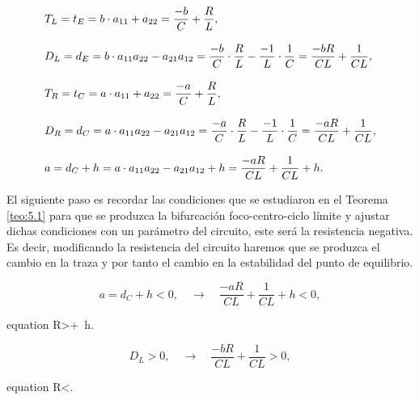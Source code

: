 \documentclass[12pt,a4paper]{report} %
\begin{document}
	\begin{equation}
		\label{eq:misistema}
			\scalebox{1}{$\displaystyle
		\begin{aligned}
			&T_L=t_E = b \cdot a_{11} + a_{22} = \frac{-b}{C}+\frac{R}{L}, \\[3mm]
			&D_L=d_E = b \cdot a_{11}a_{22} - a_{21}a_{12} = \frac{-b}{C}\cdot\frac{R}{L}-\frac{-1}{L}\cdot\frac{1}{C}=\frac{-bR}{CL}+\frac{1}{CL}, \\[3mm]
			&T_R=t_C = a \cdot a_{11} + a_{22} = \frac{-a}{C}+\frac{R}{L}, \\[3mm]
			&D_R=d_C = a \cdot a_{11}a_{22} - a_{21}a_{12} = \frac{-a}{C}\cdot\frac{R}{L}-\frac{-1}{L}\cdot\frac{1}{C}=\frac{-aR}{CL}+\frac{1}{CL},\\[3mm]
			&a=d_C+h = a \cdot a_{11}a_{22} - a_{21}a_{12}+h= \frac{-aR}{CL}+\frac{1}{CL}+h.
		\end{aligned}
		$}
	\end{equation}
	
	\newpage
	
	 El siguiente paso es recordar las condiciones que se estudiaron en el Teorema \ref{teo:5.1} para que se produzca la bifurcación foco-centro-ciclo límite y ajustar dichas condiciones con un parámetro del circuito, este será la resistencia negativa. Es decir, modificando la resistencia del circuito haremos que se produzca el cambio en la traza y por tanto el cambio en la estabilidad del punto de equilibrio.
	
	\vspace{0.5cm}{\large\textbullet\quad Condición I}
	
	\begin{equation*}
		a=d_C+h<0, \quad \longrightarrow \quad \frac{-aR}{CL}+\frac{1}{CL}+h<0,
	\end{equation*}\smallskip
	\begin{empheq}[box=\fbox]{equation}
		\label{eq:cond1}
		R>+\, h.
	\end{empheq}
	
	\vspace{1cm}{\large\textbullet\quad Condición II}
	
	\begin{equation*}
		D_L>0, \quad \longrightarrow \quad \frac{-bR}{CL}+\frac{1}{CL}>0,
	\end{equation*}\smallskip
	\begin{empheq}[box=\fbox]{equation}
		\label{eq:cond2}
		R<.
	\end{empheq}
	
\end{document}
